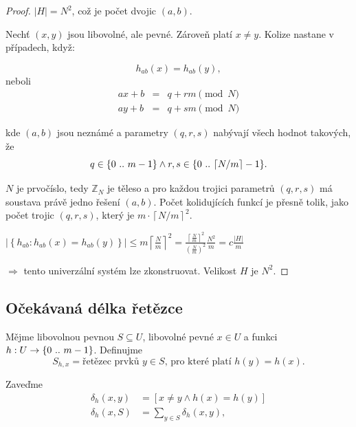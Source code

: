 \begin{proof}
\( |H|=N^{2} \), což je počet dvojic $(a,b)$.

Nechť $(x,y)$ jsou libovolné, ale pevné. 
Zároveň platí $x \neq y$.
Kolize nastane v případech, když:

\[
h_{ab}(x)=h_{ab}(y),\]
neboli
\begin{eqnarray*}
ax+b & = & q+rm\pmod N\\
ay+b & = & q+sm\pmod N
\end{eqnarray*}

kde $(a,b)$ jsou neznámé a parametry $(q,r,s)$ nabývají všech
hodnot takových, že
\[
q\in \{{0}\ ..\ {m-1}\}
\land r,s\in \{{0}\ ..\ {\left\lceil N/m\right\rceil -1}\}.
\]


$N$ je prvočíslo, tedy $\mathbb{Z}_N$ je těleso a pro každou trojici parametrů
$(q,r,s)$ má soustava právě jedno řešení $(a,b)$. 
Počet kolidujících funkcí je přesně tolik, jako počet trojic
$(q,r,s)$, který je
\( m\cdot \left\lceil N/m\right\rceil ^{2} \).

\( 
\left| \left\{ h_{ab}:h_{ab}(x)=h_{ab}(y)\right\} \right| 
\leq m\left\lceil \frac{N}{m}\right\rceil ^2
=\frac{\left\lceil \frac{N}{m}\right\rceil ^{2}}{\left(\frac{N}{m}\right) ^{2}}\frac{N^{2}}{m}
=c\frac{|H|}{m}
\)

$\Rightarrow$ tento univerzální systém lze zkonstruovat. Velikost $H$ je
$N^2$.
\end{proof}


\subsection{Očekávaná délka řetězce}

\begin{defn}
Mějme libovolnou pevnou $S \subseteq U$, libovolné pevné $x \in
U$ a funkci $h: U \to \{{0}\ ..\ {m-1}\}$. Definujme
\begin{equation}
S_{h,x}= \text{řetězec prvků $y \in S$, pro které platí $h(y) = h(x)$}.
\end{equation}

Zaveďme
\begin{align}
\delta_h(x,y) & = [ x \neq y \land h(x) = h(y) ]\\
\delta_h(x,S) & = \sum_{y \in S} \delta_h(x,y),
\end{align}
\end{defn}

